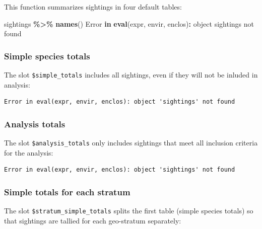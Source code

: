 \documentclass[
]{book}
\newenvironment{Shaded}{\begin{snugshade}}{\end{snugshade}}
\newcommand{\ControlFlowTok}[1]{\textcolor[rgb]{0.13,0.29,0.53}{\textbf{#1}}}
\newcommand{\FunctionTok}[1]{\textcolor[rgb]{0.13,0.29,0.53}{\textbf{#1}}}
\newcommand{\NormalTok}[1]{#1}
\newcommand{\SpecialCharTok}[1]{\textcolor[rgb]{0.81,0.36,0.00}{\textbf{#1}}}
\newcommand{\StringTok}[1]{\textcolor[rgb]{0.31,0.60,0.02}{#1}}
\begin{document}
This function summarizes sightings in four default tables:

\begin{Shaded}
\begin{Highlighting}[]
\NormalTok{sightings }\SpecialCharTok{\%\textgreater{}\%}  \FunctionTok{names}\NormalTok{()}
\NormalTok{Error }\ControlFlowTok{in} \FunctionTok{eval}\NormalTok{(expr, envir, enclos)}\SpecialCharTok{:}\NormalTok{ object }\StringTok{\textquotesingle{}sightings\textquotesingle{}}\NormalTok{ not found}
\end{Highlighting}
\end{Shaded}

\hypertarget{simple-species-totals}{%
\subsubsection*{Simple species totals}\label{simple-species-totals}}

The slot \texttt{\$simple\_totals} includes all sightings, even if they will not be inluded in analysis:

\begin{verbatim}
Error in eval(expr, envir, enclos): object 'sightings' not found
\end{verbatim}

\hypertarget{analysis-totals}{%
\subsubsection*{Analysis totals}\label{analysis-totals}}

The slot \texttt{\$analysis\_totals} only includes sightings that meet all inclusion criteria for the analysis:

\begin{verbatim}
Error in eval(expr, envir, enclos): object 'sightings' not found
\end{verbatim}

\hypertarget{simple-totals-for-each-stratum}{%
\subsubsection*{Simple totals for each stratum}\label{simple-totals-for-each-stratum}}

The slot \texttt{\$stratum\_simple\_totals} splits the first table (simple species totals) so that sightings are tallied for each geo-stratum separately:
\end{document}
